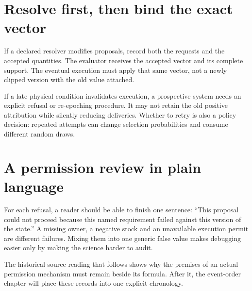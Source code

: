\section{Resolve first, then bind the exact vector}
If a declared resolver modifies proposals, record both the requests and
the accepted quantities. The evaluator receives the accepted vector and
its complete support. The eventual execution must apply that same vector,
not a newly clipped version with the old value attached.

If a late physical condition invalidates execution, a prospective system
needs an explicit refusal or re-epoching procedure. It may not retain the
old positive attribution while silently reducing deliveries. Whether to
retry is also a policy decision: repeated attempts can change selection
probabilities and consume different random draws.

\section{A permission review in plain language}
For each refusal, a reader should be able to finish one sentence:
``This proposal could not proceed because this named requirement failed
against this version of the state.'' A missing owner, a negative stock and
an unavailable execution permit are different failures. Mixing them into
one generic false value makes debugging easier only by making the science
harder to audit.

The historical source reading that follows shows why the premises of an
actual permission mechanism must remain beside its formula. After it,
the event-order chapter will place these records into one explicit chronology.
